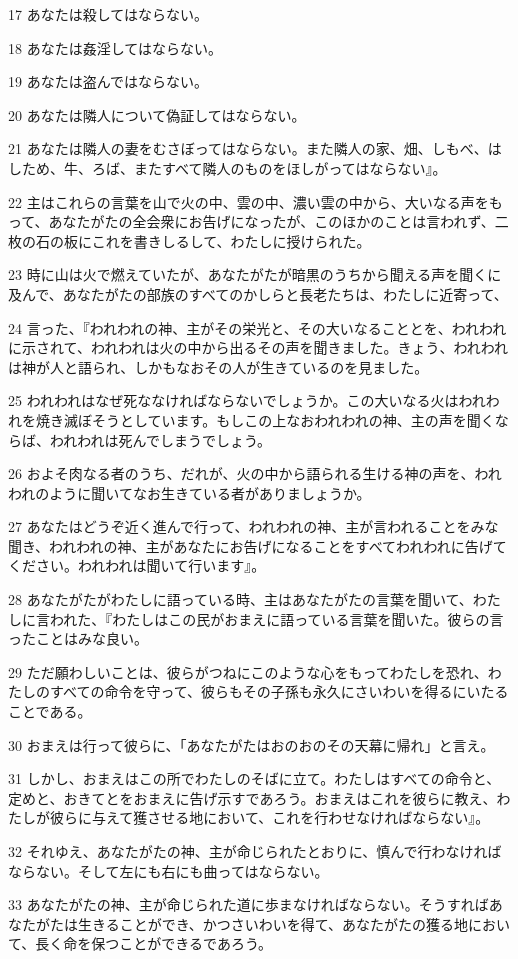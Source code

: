 \par 17 あなたは殺してはならない。
\par 18 あなたは姦淫してはならない。
\par 19 あなたは盗んではならない。
\par 20 あなたは隣人について偽証してはならない。
\par 21 あなたは隣人の妻をむさぼってはならない。また隣人の家、畑、しもべ、はしため、牛、ろば、またすべて隣人のものをほしがってはならない』。
\par 22 主はこれらの言葉を山で火の中、雲の中、濃い雲の中から、大いなる声をもって、あなたがたの全会衆にお告げになったが、このほかのことは言われず、二枚の石の板にこれを書きしるして、わたしに授けられた。
\par 23 時に山は火で燃えていたが、あなたがたが暗黒のうちから聞える声を聞くに及んで、あなたがたの部族のすべてのかしらと長老たちは、わたしに近寄って、
\par 24 言った、『われわれの神、主がその栄光と、その大いなることとを、われわれに示されて、われわれは火の中から出るその声を聞きました。きょう、われわれは神が人と語られ、しかもなおその人が生きているのを見ました。
\par 25 われわれはなぜ死ななければならないでしょうか。この大いなる火はわれわれを焼き滅ぼそうとしています。もしこの上なおわれわれの神、主の声を聞くならば、われわれは死んでしまうでしょう。
\par 26 およそ肉なる者のうち、だれが、火の中から語られる生ける神の声を、われわれのように聞いてなお生きている者がありましょうか。
\par 27 あなたはどうぞ近く進んで行って、われわれの神、主が言われることをみな聞き、われわれの神、主があなたにお告げになることをすべてわれわれに告げてください。われわれは聞いて行います』。
\par 28 あなたがたがわたしに語っている時、主はあなたがたの言葉を聞いて、わたしに言われた、『わたしはこの民がおまえに語っている言葉を聞いた。彼らの言ったことはみな良い。
\par 29 ただ願わしいことは、彼らがつねにこのような心をもってわたしを恐れ、わたしのすべての命令を守って、彼らもその子孫も永久にさいわいを得るにいたることである。
\par 30 おまえは行って彼らに、「あなたがたはおのおのその天幕に帰れ」と言え。
\par 31 しかし、おまえはこの所でわたしのそばに立て。わたしはすべての命令と、定めと、おきてとをおまえに告げ示すであろう。おまえはこれを彼らに教え、わたしが彼らに与えて獲させる地において、これを行わせなければならない』。
\par 32 それゆえ、あなたがたの神、主が命じられたとおりに、慎んで行わなければならない。そして左にも右にも曲ってはならない。
\par 33 あなたがたの神、主が命じられた道に歩まなければならない。そうすればあなたがたは生きることができ、かつさいわいを得て、あなたがたの獲る地において、長く命を保つことができるであろう。

